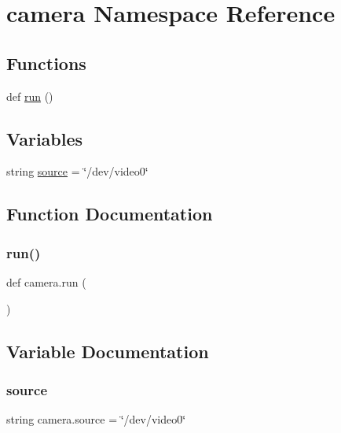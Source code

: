 \hypertarget{namespacecamera}{}\section{camera Namespace Reference}
\label{namespacecamera}
\subsection*{Functions}
\begin{DoxyCompactItemize}
\item 
def \hyperlink{namespacecamera_a432b6ffa62129798457e0dc046f998dc}{run} ()
\end{DoxyCompactItemize}
\subsection*{Variables}
\begin{DoxyCompactItemize}
\item 
string \hyperlink{namespacecamera_a4fc0b7b596c01e4d62b99a5e1c058453}{source} = \char`\"{}/dev/video0\char`\"{}
\end{DoxyCompactItemize}


\subsection{Function Documentation}
\mbox{\label{namespacecamera_a432b6ffa62129798457e0dc046f998dc}} 
\subsubsection{\texorpdfstring{run()}{run()}}
{\footnotesize\ttfamily def camera.\+run (\begin{DoxyParamCaption}{ }\end{DoxyParamCaption})}



\subsection{Variable Documentation}
\mbox{\label{namespacecamera_a4fc0b7b596c01e4d62b99a5e1c058453}} 
\subsubsection{\texorpdfstring{source}{source}}
{\footnotesize\ttfamily string camera.\+source = \char`\"{}/dev/video0\char`\"{}}


